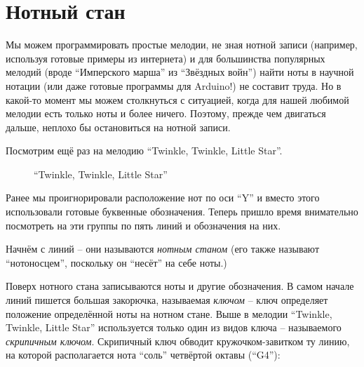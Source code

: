 \documentclass[../sparc.tex]{subfiles}
\begin{document}
\newpage
\section{Нотный стан}

Мы можем программировать простые мелодии, не зная нотной записи (например,
используя готовые примеры из интернета) и для большинства популярных мелодий
(вроде ``Имперского марша'' из ``Звёздных войн'') найти ноты в научной нотации
(или даже готовые программы для Arduino!) не составит труда. Но в какой-то
момент мы можем столкнуться с ситуацией, когда для нашей любимой мелодии есть
только ноты и более ничего.  Поэтому, прежде чем двигаться дальше, неплохо бы
остановиться на нотной записи.

Посмотрим ещё раз на мелодию ``Twinkle, Twinkle, Little Star''.

\begin{figure}[ht]
  \centering
  \label{fig:sound-fig-4}
  \caption{``Twinkle, Twinkle, Little Star''}
\end{figure}

Ранее мы проигнорировали расположение нот по оси ``Y'' и вместо этого
использовали готовые буквенные обозначения. Теперь пришло время внимательно
посмотреть на эти группы по пять линий и обозначения на них.

Начнём с линий -- они называются \emph{нотным станом} (его также называют
``нотоносцем'', поскольку он ``несёт'' на себе ноты.)

Поверх нотного стана записываются ноты и другие обозначения. В самом начале
линий пишется большая закорючка, называемая \emph{ключом} -- ключ определяет
положение определённой ноты на нотном стане. Выше в мелодии ``Twinkle, Twinkle,
Little Star'' используется только один из видов ключа -- называемого
\emph{скрипичным ключом}. Скрипичный ключ обводит кружочком-завитком ту линию,
на которой располагается нота ``соль'' четвёртой октавы (``G4''):
\end{document}
